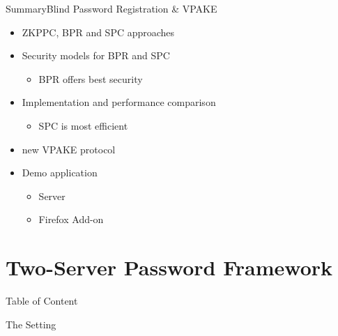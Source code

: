 \documentclass[notes,xcolor=dvipsnames]{beamer}
\begin{document}
\begin{frame}{Summary}{Blind Password Registration \& VPAKE}
  \begin{itemize}
    \item ZKPPC, BPR and SPC approaches
    \item Security models for BPR and SPC
    \begin{itemize}
      \item BPR offers best security
    \end{itemize}
    \item Implementation and performance comparison
    \begin{itemize}
      \item SPC is most efficient
    \end{itemize}
    \item new VPAKE protocol
    \item Demo application
    \begin{itemize}
      \item Server
      \item Firefox Add-on
    \end{itemize}
  \end{itemize}
\end{frame}

\section{Two-Server Password Framework}%

\begin{frame}{Table of Content}
\tableofcontents[currentsection]
\end{frame}

\begin{frame}{The Setting}
  \begin{figure}
  \end{figure}
\end{frame}
\end{document}

